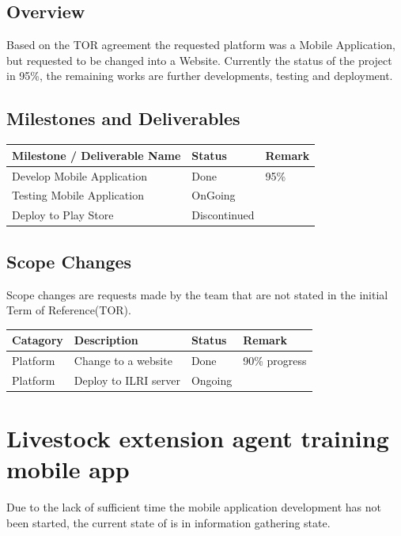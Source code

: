 \documentclass[12pt]{extarticle}
\begin{document}
\subsection{Overview}
Based on the TOR agreement the requested platform was a Mobile Application, but requested to be changed into a Website. Currently the status of the project in 95\%, the remaining works are further developments, testing and deployment.

\subsection{Milestones and Deliverables}
\begin{center}
\begin{tabular}{ |p{7cm}|p{3cm}|p{4cm}| } 
\hline
\textbf{Milestone / Deliverable Name} & \textbf{Status} & \textbf{Remark}  \\
\hline
Develop Mobile Application &  Done & 95\% \\
\hline
Testing Mobile Application &  OnGoing & \\
\hline
Deploy to Play Store &  Discontinued & \\
\hline
\end{tabular}
\end{center}

\subsection{Scope Changes}
Scope changes are requests made by the team that are not stated in the initial Term of Reference(TOR).
\begin{center}
\begin{tabular}{ |p{2cm}|p{7cm}|p{3cm}|p{2cm}| } 
\hline
\textbf{Catagory} & \textbf{Description} & \textbf{Status} & \textbf{Remark}  \\
\hline
Platform & Change to a website & Done & 90\% progress \\
\hline
Platform & Deploy to ILRI server & Ongoing & \\
\hline
\end{tabular}
\end{center}

\section{Livestock extension agent training mobile app}
Due to the lack of sufficient time the mobile application development has not been started, the current state of is in information gathering state.
\end{document}
